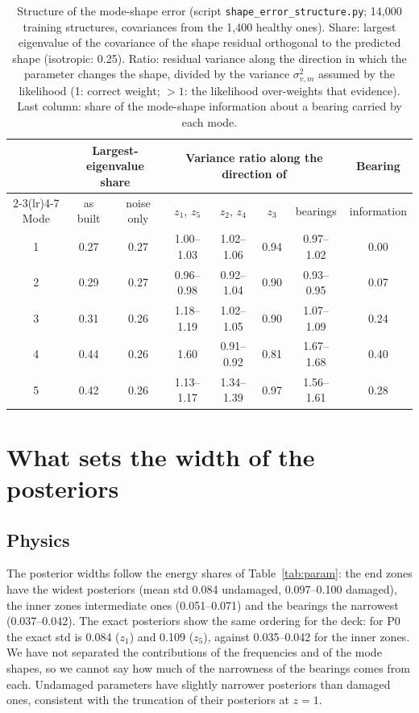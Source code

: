 \documentclass[11pt]{article}
\begin{document}
\begin{table}[t]
\centering\footnotesize
\setlength{\tabcolsep}{4pt}
\caption{Structure of the mode-shape error (script \texttt{shape\_error\_structure.py}; 14,000 training structures,
covariances from the 1,400 healthy ones).
Share: largest eigenvalue of the covariance of the shape residual orthogonal to the predicted shape (isotropic: 0.25).
Ratio: residual variance along the direction in which the parameter changes the shape, divided by the variance
$\sigma_{v,m}^2$ assumed by the likelihood (1: correct weight; $>1$: the likelihood over-weights that evidence). Last
column: share of the mode-shape information about a bearing carried by each mode.}
\label{tab:shape_error}
\begin{tabular}{c cc cccc c}
\toprule
 & \multicolumn{2}{c}{Largest-eigenvalue share} & \multicolumn{4}{c}{Variance ratio along the direction of} & Bearing \\
\cmidrule(lr){2-3}\cmidrule(lr){4-7}
Mode & as built & noise only & $z_1$, $z_5$ & $z_2$, $z_4$ & $z_3$ & bearings & information \\
\midrule
1 & 0.27 & 0.27 & 1.00--1.03 & 1.02--1.06 & 0.94 & 0.97--1.02 & 0.00 \\
2 & 0.29 & 0.27 & 0.96--0.98 & 0.92--1.04 & 0.90 & 0.93--0.95 & 0.07 \\
3 & 0.31 & 0.26 & 1.18--1.19 & 1.02--1.05 & 0.90 & 1.07--1.09 & 0.24 \\
4 & 0.44 & 0.26 & 1.60       & 0.91--0.92 & 0.81 & 1.67--1.68 & 0.40 \\
5 & 0.42 & 0.26 & 1.13--1.17 & 1.34--1.39 & 0.97 & 1.56--1.61 & 0.28 \\
\bottomrule
\end{tabular}
\end{table}

\section{What sets the width of the posteriors}\label{sec:width}

\subsection{Physics}
The posterior widths follow the energy shares of Table~\ref{tab:param}: the end zones have the widest posteriors
(mean std 0.084 undamaged, 0.097--0.100 damaged), the inner zones intermediate ones (0.051--0.071) and the bearings
the narrowest (0.037--0.042). The exact posteriors show the same ordering for the deck: for P0 the exact std is 0.084
($z_1$) and 0.109 ($z_5$), against 0.035--0.042 for the inner zones. We have not separated the contributions of the
frequencies and of the mode shapes, so we cannot say how much of the narrowness of the bearings comes from each.
Undamaged parameters have slightly narrower posteriors than damaged ones, consistent with the truncation of their
posteriors at $z=1$.
\end{document}

